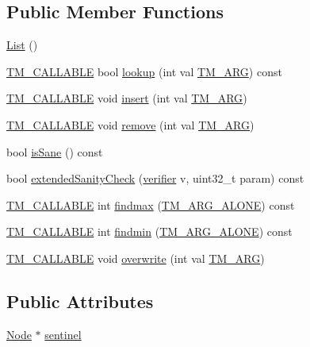 \subsection*{Public Member Functions}
\begin{DoxyCompactItemize}
\item 
\hyperlink{classList_a64d878a92d11f7c63c70cbe4e7dd4176}{List} ()
\item 
\hyperlink{tm_8h_adf0341d9b0d169f1aba20257caed702e}{T\-M\-\_\-\-C\-A\-L\-L\-A\-B\-L\-E} bool \hyperlink{classList_a90ad13d3e3bb04ca8ade206e2169808d}{lookup} (int val \hyperlink{tm_8h_a030f4350a175fed7a99c242cbaa53258}{T\-M\-\_\-\-A\-R\-G}) const 
\item 
\hyperlink{tm_8h_adf0341d9b0d169f1aba20257caed702e}{T\-M\-\_\-\-C\-A\-L\-L\-A\-B\-L\-E} void \hyperlink{classList_a40fadae377879ab1219603a6138d5a54}{insert} (int val \hyperlink{tm_8h_a030f4350a175fed7a99c242cbaa53258}{T\-M\-\_\-\-A\-R\-G})
\item 
\hyperlink{tm_8h_adf0341d9b0d169f1aba20257caed702e}{T\-M\-\_\-\-C\-A\-L\-L\-A\-B\-L\-E} void \hyperlink{classList_a32e2c5d870d4cfb2fb38d3a446173148}{remove} (int val \hyperlink{tm_8h_a030f4350a175fed7a99c242cbaa53258}{T\-M\-\_\-\-A\-R\-G})
\item 
bool \hyperlink{classList_aeca38d275d9168eeaff3313c15abd120}{is\-Sane} () const 
\item 
bool \hyperlink{classList_a4b4f6be0c2514906a0bd55502f9f5788}{extended\-Sanity\-Check} (\hyperlink{List_8hpp_a0b34b0d5aa05650e72ff076ac10580ad}{verifier} v, uint32\-\_\-t param) const 
\item 
\hyperlink{tm_8h_adf0341d9b0d169f1aba20257caed702e}{T\-M\-\_\-\-C\-A\-L\-L\-A\-B\-L\-E} int \hyperlink{classList_a207d2ab315de296f244a09d0851cfffc}{findmax} (\hyperlink{tm_8h_a5f5ab8a008b9734c5378be81bcb3639e}{T\-M\-\_\-\-A\-R\-G\-\_\-\-A\-L\-O\-N\-E}) const 
\item 
\hyperlink{tm_8h_adf0341d9b0d169f1aba20257caed702e}{T\-M\-\_\-\-C\-A\-L\-L\-A\-B\-L\-E} int \hyperlink{classList_a4ed615418c16ac441ce219bb959d6ba7}{findmin} (\hyperlink{tm_8h_a5f5ab8a008b9734c5378be81bcb3639e}{T\-M\-\_\-\-A\-R\-G\-\_\-\-A\-L\-O\-N\-E}) const 
\item 
\hyperlink{tm_8h_adf0341d9b0d169f1aba20257caed702e}{T\-M\-\_\-\-C\-A\-L\-L\-A\-B\-L\-E} void \hyperlink{classList_a0c31f430d668d9bb50d66eae4a1c08b8}{overwrite} (int val \hyperlink{tm_8h_a030f4350a175fed7a99c242cbaa53258}{T\-M\-\_\-\-A\-R\-G})
\end{DoxyCompactItemize}
\subsection*{Public Attributes}
\begin{DoxyCompactItemize}
\item 
\hyperlink{structList_1_1Node}{Node} $\ast$ \hyperlink{classList_a99056f0e06a4c3159b7de40595143de8}{sentinel}
\end{DoxyCompactItemize}



